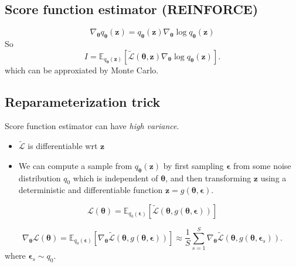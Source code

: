 \documentclass[../main.tex]{subfiles}
\begin{document}
\subsection{Score function estimator (REINFORCE)}

\[
\nabla_{\boldsymbol{\theta}} q_{\boldsymbol{\theta}}(\boldsymbol{z}) = q_{\boldsymbol{\theta}}(\boldsymbol{z}) \nabla_{\boldsymbol{\theta}} \log q_{\boldsymbol{\theta}}(\boldsymbol{z})
\]
So
\[
I = \mathbb{E}_{q_{\boldsymbol{\theta}}(\boldsymbol{z})} \left[ \tilde{\mathcal{L}}(\boldsymbol{\theta}, \boldsymbol{z}) \nabla_{\boldsymbol{\theta}} \log q_{\boldsymbol{\theta}}(\boldsymbol{z}) \right] .
\]
which can be approxiated by Monte Carlo.


\subsection{Reparameterization trick}\label{sec:reparameterization}

Score function estimator can have \emph{high variance}. 
\assumption{}{} {
   \begin{itemize}
   \item  $\tilde{\mathcal{L}}$ is differentiable wrt $\boldsymbol{z}$
   \item We can compute a sample from $q_{\boldsymbol{\theta}}(\boldsymbol{z})$ by first sampling $\boldsymbol{\epsilon}$ from some noise distribution $q_{0}$
   which is independent of $\boldsymbol{\theta}$, and then transforming $\boldsymbol{z}$ using a deterministic and differentiable function $\boldsymbol{z} = g(\boldsymbol{\theta}, \boldsymbol{\epsilon})$.
   \end{itemize} 
}

\[
\mathcal{L}(\boldsymbol{\theta}) = \mathbb{E}_{q_{0}(\boldsymbol{\epsilon})} \left[ \tilde{\mathcal{L}}(\boldsymbol{\theta}, g(\boldsymbol{\theta}, \boldsymbol{\epsilon})) \right] 
\]

\[
\nabla_{\boldsymbol{\theta}} \mathcal{L}(\boldsymbol{\theta}) = \mathbb{E}_{q_0(\boldsymbol{\epsilon})} \left[ \nabla_{\boldsymbol{\theta}} \tilde{\mathcal{L}} (\boldsymbol{\theta}, g(\boldsymbol{\theta}, \boldsymbol{\epsilon}))\right] \approx  \frac{1}{S} \sum_{s=1}^{S} \nabla_{\boldsymbol{\theta}} \tilde{\mathcal{L}} \left( \boldsymbol{\theta}, g(\boldsymbol{\theta}, \boldsymbol{\epsilon}_{s}) \right) .
\]
where $\boldsymbol{\epsilon}_{s} \sim  q_{0}$.
\end{document}
